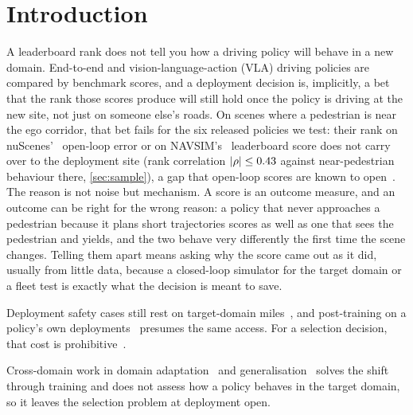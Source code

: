 \section{Introduction}
\label{sec:intro}
A leaderboard rank does not tell you how a driving policy will behave in a new domain. End-to-end and vision-language-action (VLA) driving policies are compared by benchmark scores, and a deployment decision is, implicitly, a bet that the rank those scores produce will still hold once the policy is driving at the new site, not just on someone else's roads. 
On scenes where a pedestrian is near the ego corridor, that bet fails for the six released policies we test: their rank on nuScenes'~\cite{caesar2020nuscenes} open-loop error or on NAVSIM's~\cite{dauner2024navsim} leaderboard score does not carry over to the deployment site (rank correlation $|\rho|\le0.43$ against near-pedestrian behaviour there, \cref{sec:sample}), a gap that open-loop scores are known to open~\cite{zhao2026bridgesim,li2024egostatus,codevilla2019exploring}. The reason is not noise but mechanism. A score is an outcome measure, and an outcome can be right for the wrong reason: a policy that never approaches a pedestrian because it plans short trajectories scores as well as one that sees the pedestrian and yields, and the two behave very differently the first time the scene changes. Telling them apart means asking why the score came out as it did, usually from little data, because a closed-loop simulator for the target domain or a fleet test is exactly what the decision is meant to save.


Deployment safety cases still rest on target-domain miles~\cite{kusano2025waymo56m}, and post-training on a policy's own deployments~\cite{pi2025pistar06} presumes the same access. For a selection decision, that cost is prohibitive~\cite{kalra2016driving}.

Cross-domain work in domain adaptation~\cite{ganin2015dann} and generalisation~\cite{gulrajani2021lost}
solves the shift through training and does not assess how a policy behaves in the target domain, so
it leaves the selection problem at deployment open.

